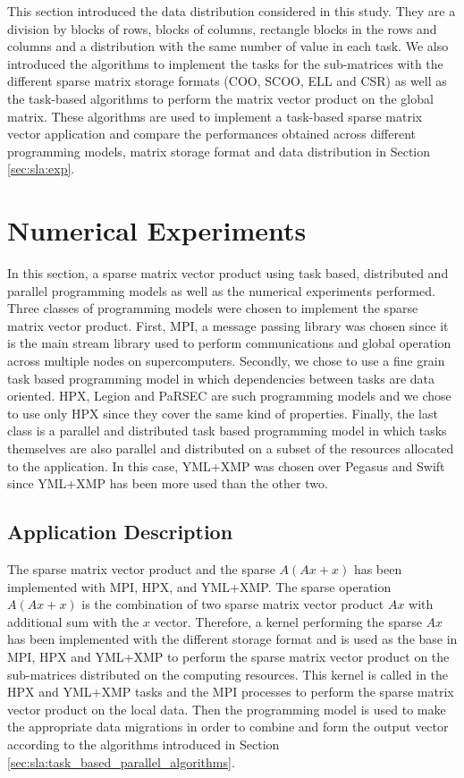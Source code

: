 This section introduced the data distribution considered in this study.
They are a division by blocks of rows, blocks of columns, rectangle blocks in the rows and columns and a distribution with the same number of value in each task.
We also introduced the algorithms to implement the tasks for the sub-matrices with the different sparse matrix storage formats (COO, SCOO, ELL and CSR) as well as the task-based algorithms to perform the matrix vector product on the global matrix.
These algorithms are used to implement a task-based sparse matrix vector application and compare the performances obtained across different programming models, matrix storage format and data distribution in Section \ref{sec:sla:exp}.

\section{Numerical Experiments \label{sec:sla:exp}}
In this section, a sparse matrix vector product using task based, distributed and parallel programming models as well as the numerical experiments performed.
Three classes of programming models were chosen to implement the sparse matrix vector product.
First, MPI, a message passing library was chosen since it is the main stream library used to perform communications and global operation across multiple nodes on supercomputers.
Secondly, we chose to use a fine grain task based programming model in which dependencies between tasks are data oriented.
HPX, Legion and PaRSEC are such programming models and we chose to use only HPX since they cover the same kind of properties.
Finally, the last class is a parallel and distributed task based programming model in which tasks themselves are also parallel and distributed on a subset of the resources allocated to the application.
In this case, YML+XMP was chosen over Pegasus and Swift since YML+XMP has been more used than the other two.

\subsection{Application Description}
The sparse matrix vector product and the sparse $A(Ax+x)$ has been implemented with MPI, HPX, and YML+XMP.
The sparse operation $A(Ax+x)$ is the combination of two sparse matrix vector product $Ax$ with additional sum with the $x$ vector.
Therefore, a kernel performing the sparse $Ax$ has been implemented with the different storage format and is used as the base in MPI, HPX and YML+XMP to perform the sparse matrix vector product on the sub-matrices distributed on the computing resources.
This kernel is called in the HPX and YML+XMP tasks and the MPI processes to perform the sparse matrix vector product on the local data.
Then the programming model is used to make the appropriate data migrations in order to combine and form the output vector according to the algorithms introduced in Section \ref{sec:sla:task_based_parallel_algorithms}.

